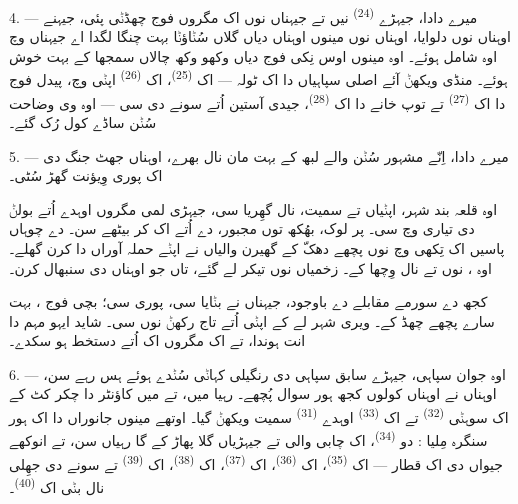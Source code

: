 \VUsaut{4.0mm}
\VUsaut{2.8mm}

4. --- میرے دادا، جیہڑے  \textsuperscript{(24)} نیں تے
جیہناں نوں اک  مگروں فوج چھڈݨی پئی، جیہنے اوہناں نوں
 دلوایا، اوہناں نوں مینوں اوہناں  دیاں گلاں سُݨاؤݨا
بہت چنگا لگدا اے جیہناں وچ اوہ شامل ہوئے۔ اوہ مینوں اوس نِکی فوج دیاں وکھو وکھ
چالاں سمجھا کے بہت خوش ہوئے۔ منڈی ویکھݨ آئے اصلی سپاہیاں دا اک ٹولہ — اک
 \textsuperscript{(25)}، اک 
\textsuperscript{(26)} اپݨی  وچ، پیدل فوج دا اک 
\textsuperscript{(27)} تے توپ خانے دا اک  \textsuperscript{(28)}،
جیدی آستین اُتے سونے دی  سی — اوہ وی وضاحت سُݨن ساڈے کول رُک گئے۔

5. --- میرے دادا، اِنّے مشہور سُݨن والے لبھ کے بہت مان نال بھرے، اوہناں جھٹ جنگ دی
اک پوری وِیؤنت گھڑ سُٹی۔

اوہ قلعہ بند شہر، اپݨیاں  تے  سمیت،
 نال گھِریا سی، جیہڑی لمی  مگروں اوہدے اُتے
 بولݨ دی تیاری وچ سی۔ پر  لوک، بھُکھ توں مجبور،
 دے  اُتے اک  کر بیٹھے سن۔
 دے چوہاں پاسیں اک تِکھی  وچ  نوں پچھے دھکّ
کے  گھیرن والیاں نے اپݨے 
 حملہ آوراں دا  کرن گھلے۔ اوہ ،
 نوں  تے  نال وِچھا کے۔
 زخمیاں نوں  تیکر لے گئے، تاں جو
 اوہناں دی سنبھال کرن۔

کجھ  دے سورمے مقابلے دے باوجود، جیہناں نے 
بݨایا سی،  پوری سی؛ بچی فوج ، بہت سارے 
پچھے چھڈ کے۔ ویری شہر لے کے اپݨی  اُتے تاج رکھݨ نوں سی۔ شاید ایہو مہم دا
انت ہوندا، تے اک  مگروں اک  اُتے دستخط ہو
سکدے۔

\VUsaut{4.4mm}
\VUsaut{2.8mm}

6. --- اوہ جوان سپاہی، جیہڑے سابق سپاہی دی رنگیلی کہاݨی سُݨدے ہوئے ہس رہے سن،
اوہناں نے اوہناں کولوں کجھ ہور سوال پُچھے۔ رہیا میں، تے میں کاؤنٹر دا چکر کٹ کے اک
سوہݨی  \textsuperscript{(32)} تے اک  \textsuperscript{(33)}
اوہدے  \textsuperscript{(31)} سمیت ویکھݨ گیا۔ اوتھے مینوں جانوراں دا اک
ہور سنگرہ مِلیا : دو  \textsuperscript{(34)}، اک چابی والی
 تے  جیہڑیاں گلا پھاڑ کے گا رہیاں سن، تے انوکھے جیواں دی
اک قطار — اک  \textsuperscript{(35)}، اک 
\textsuperscript{(36)}، اک  \textsuperscript{(37)}، اک 
\textsuperscript{(38)}، اک  \textsuperscript{(39)} تے سونے دی جھِلی نال
بݨی اک  \textsuperscript{(40)}۔

